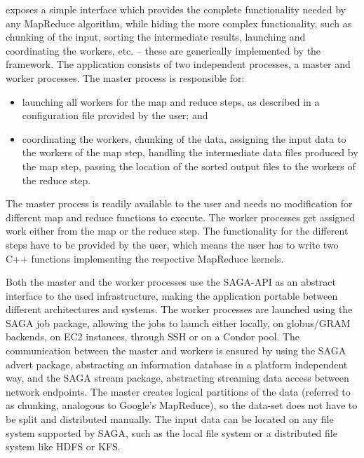 \documentclass[3p,twocolumn]{elsarticle}
\begin{document}
\smr exposes a simple interface which provides the complete
functionality needed by any MapReduce algorithm, while hiding the more
complex functionality, such as chunking of the input, sorting the
intermediate results, launching and coordinating the workers, etc. --
these are generically implemented by the framework.  The application
consists of two independent processes, a master and worker processes.
The master process is responsible for:

\begin{itemize}

 \item launching all workers for the map and reduce steps, as
 described in a configuration file provided by the user; and

 \item coordinating the workers, chunking of the data, assigning the
 input data to the workers of the map step, handling the intermediate
 data files produced by the map step, passing the location of the
 sorted output files to the workers of the reduce step.  


\end{itemize}

The master process is readily available to the user and needs no
modification for different map and reduce functions to execute.  The
worker processes get assigned work either from the map or the reduce
step. The functionality for the different steps have to be provided by
the user, which means the user has to write two C++ functions
implementing the respective MapReduce kernels.

Both the master and the worker processes use the SAGA-API as an
abstract interface to the used infrastructure, making the application
portable between different architectures and systems.  The worker
processes are launched using the SAGA job package, allowing the jobs
to launch either locally, on globus/GRAM backends, on EC2 instances, through SSH
or on a Condor pool. The communication between the master and workers
is ensured by using the SAGA advert package, abstracting an
information database in a platform independent way, and the SAGA stream
package, abstracting streaming data access between network endpoints.
The master creates logical partitions of the data (referred to as chunking,
analogous to Google's MapReduce), so the data-set does not have to be split
and distributed manually.  The input data can be located on any file system
supported by SAGA, such as the local file system or a distributed file system
like HDFS or KFS. 
\end{document}
